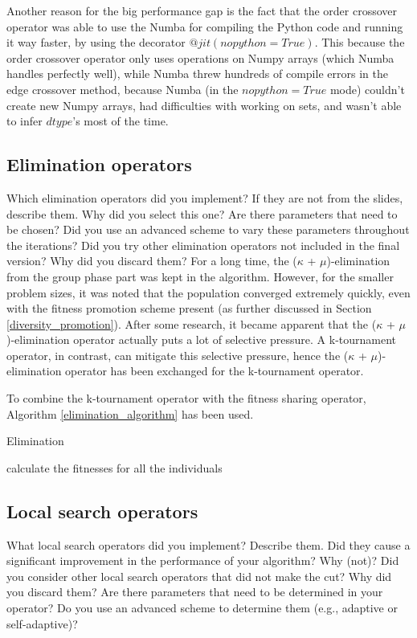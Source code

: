 \documentclass[a4paper,10pt]{article}
\newcommand{\ReplaceMe}[1]{{\color{blue}#1}}
\begin{document}
Another reason for the big performance gap is the fact that the order crossover operator was able to use the Numba for compiling the Python code and running it way faster, by using the decorator $@jit(nopython=True)$. This because the order crossover operator only uses operations on Numpy arrays (which Numba handles perfectly well), while Numba threw hundreds of compile errors in the edge crossover method, because Numba (in the $nopython=True$ mode) couldn't create new Numpy arrays, had difficulties with working on sets, and wasn't able to infer $dtype$'s most of the time.

\subsection{Elimination operators}
\label{elimination}
\ReplaceMe{Which elimination operators did you implement? If they are not from the slides, describe them. Why did you select this one? Are there parameters that need to be chosen? Did you use an advanced scheme to vary these parameters throughout the iterations? Did you try other elimination operators not included in the final version? Why did you discard them?}
For a long time, the ($\kappa$ + $\mu$)-elimination from the group phase part was kept in the algorithm. However, for the smaller problem sizes, it was noted that the population converged extremely quickly, even with the fitness promotion scheme present (as further discussed in Section \ref{diversity_promotion}). After some research, it became apparent that the ($\kappa$ + $\mu$)-elimination operator actually puts a lot of selective pressure. A k-tournament operator, in contrast, can mitigate this selective pressure, hence the ($\kappa$ + $\mu$)-elimination operator has been exchanged for the k-tournament operator.

To combine the k-tournament operator with the fitness sharing operator, Algorithm \ref{elimination_algorithm} has been used.

\begin{algorithm}
\caption{Elimination \cite{eiben_smith}}\label{elimination_algorithm}
\begin{algorithmic}
\State calculate the fitnesses for all the individuals
\ %
\end{algorithmic}
\end{algorithm}


\subsection{Local search operators}
\label{local_search_operator}
\ReplaceMe{What local search operators did you implement? Describe them. Did they cause a significant improvement in the performance of your algorithm? Why (not)? Did you consider other local search operators that did not make the cut? Why did you discard them? Are there parameters that need to be determined in your operator? Do you use an advanced scheme to determine them (e.g., adaptive or self-adaptive)?}
\end{document}
